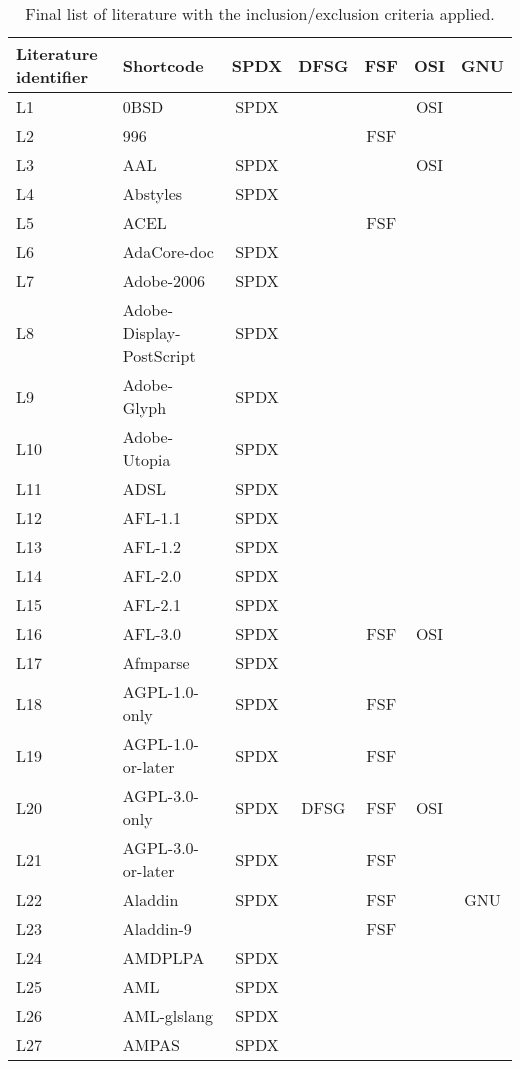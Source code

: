 
\begin{longtable}[h]{m{2cm} | m{7cm} | c | c | c | c | c}
  \caption{Final list of literature with the inclusion/exclusion criteria applied.} \label{table:appendix:a} \\
  \hline
  Literature identifier & Shortcode & SPDX & DFSG & FSF & OSI & GNU \\
  \hline
L1 & 0BSD & SPDX &  &  & OSI &  \\
L2 & 996 &  &  & FSF &  &  \\
L3 & AAL & SPDX &  &  & OSI &  \\
L4 & Abstyles & SPDX &  &  &  &  \\
L5 & ACEL &  &  & FSF &  &  \\
L6 & AdaCore-doc & SPDX &  &  &  &  \\
L7 & Adobe-2006 & SPDX &  &  &  &  \\
L8 & Adobe-Display-PostScript & SPDX &  &  &  &  \\
L9 & Adobe-Glyph & SPDX &  &  &  &  \\
L10 & Adobe-Utopia & SPDX &  &  &  &  \\
L11 & ADSL & SPDX &  &  &  &  \\
L12 & AFL-1.1 & SPDX &  &  &  &  \\
L13 & AFL-1.2 & SPDX &  &  &  &  \\
L14 & AFL-2.0 & SPDX &  &  &  &  \\
L15 & AFL-2.1 & SPDX &  &  &  &  \\
L16 & AFL-3.0 & SPDX &  & FSF & OSI &  \\
L17 & Afmparse & SPDX &  &  &  &  \\
L18 & AGPL-1.0-only & SPDX &  & FSF &  &  \\
L19 & AGPL-1.0-or-later & SPDX &  & FSF &  &  \\
L20 & AGPL-3.0-only & SPDX & DFSG & FSF & OSI &  \\
L21 & AGPL-3.0-or-later & SPDX &  & FSF &  &  \\
L22 & Aladdin & SPDX &  & FSF &  & GNU \\
L23 & Aladdin-9 &  &  & FSF &  &  \\
L24 & AMDPLPA & SPDX &  &  &  &  \\
L25 & AML & SPDX &  &  &  &  \\
L26 & AML-glslang & SPDX &  &  &  &  \\
L27 & AMPAS & SPDX &  &  &  &  \\

\end{longtable}
